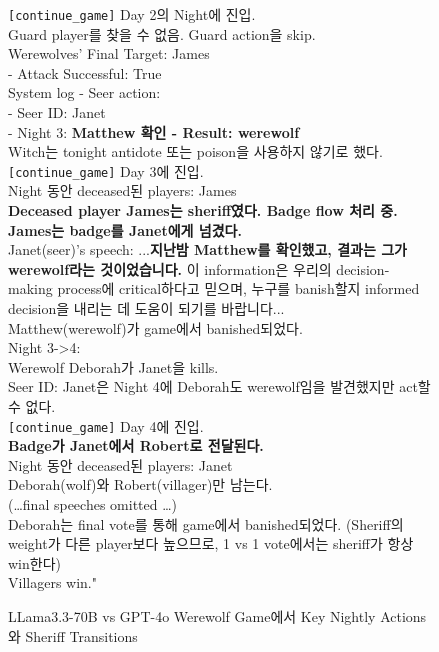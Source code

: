 \begin{figure}[htbp]
\begin{tcolorbox}[colback=green!2!white, colframe=gray!50!green]
\begin{minipage}{\linewidth}
\texttt{[continue\_game]} Day 2의 Night에 진입. \\
Guard player를 찾을 수 없음. Guard action을 skip.  \\
Werewolves' Final Target: James  \\
 - Attack Successful: True  \\
System log - Seer action:  \\
 - Seer ID: Janet  \\
 - Night 3: \textbf{Matthew 확인 - Result: werewolf } \\
Witch는 tonight antidote 또는 poison을 사용하지 않기로 했다.  \\

\texttt{[continue\_game]} Day 3에 진입.  \\
Night 동안 deceased된 players: James  \\
\textbf{Deceased player James는 sheriff였다. Badge flow 처리 중. James는 badge를 Janet에게 넘겼다.  }  \\
Janet(seer)'s speech: ...\textbf{지난밤 Matthew를 확인했고, 결과는 그가 werewolf라는 것이었습니다.} 이 information은 우리의 decision-making process에 critical하다고 믿으며, 누구를 banish할지 informed decision을 내리는 데 도움이 되기를 바랍니다...\\
Matthew(werewolf)가 game에서 banished되었다.  \\

Night 3->4:  \\
Werewolf Deborah가 Janet을 kills.  \\
Seer ID: Janet은 Night 4에 Deborah도 werewolf임을 발견했지만 act할 수 없다.  \\

\texttt{[continue\_game]} Day 4에 진입.  \\
\textbf{Badge가 Janet에서 Robert로 전달된다.}  \\
Night 동안 deceased된 players: Janet  \\

Deborah(wolf)와 Robert(villager)만 남는다.  \\
(\ldots final speeches omitted \ldots)  \\
Deborah는 final vote를 통해 game에서 banished되었다. (Sheriff의 weight가 다른 player보다 높으므로, 1 vs 1 vote에서는 sheriff가 항상 win한다) \\
Villagers win."\\
\end{minipage}
\end{tcolorbox}
\caption{LLama3.3-70B vs GPT-4o Werewolf Game에서 Key Nightly Actions와 Sheriff Transitions}
\label{fig:private_event_log}
\end{figure}


